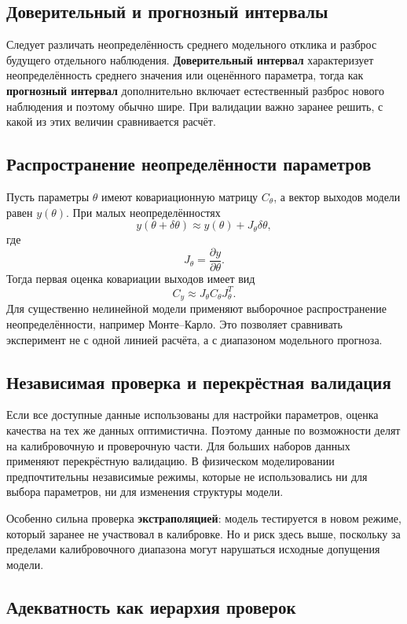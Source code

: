 \subsection{Доверительный и прогнозный интервалы}

Следует различать неопределённость среднего модельного отклика и разброс будущего
отдельного наблюдения. \textbf{Доверительный интервал} характеризует
неопределённость среднего значения или оценённого параметра, тогда как
\textbf{прогнозный интервал} дополнительно включает естественный разброс нового
наблюдения и поэтому обычно шире. При валидации важно заранее решить, с какой из
этих величин сравнивается расчёт.

\subsection{Распространение неопределённости параметров}

Пусть параметры $\theta$ имеют ковариационную матрицу $C_\theta$, а вектор
выходов модели равен $y(\theta)$. При малых неопределённостях
\[
    y(\theta+\delta\theta)
    \approx y(\theta)+J_\theta\delta\theta,
\]
где
\[
    J_\theta=\frac{\partial y}{\partial\theta}.
\]
Тогда первая оценка ковариации выходов имеет вид
\[
    \boxed{C_y\approx J_\theta C_\theta J_\theta^T.}
\]
Для существенно нелинейной модели применяют выборочное распространение
неопределённости, например Монте--Карло. Это позволяет сравнивать эксперимент не
с одной линией расчёта, а с диапазоном модельного прогноза.

\subsection{Независимая проверка и перекрёстная валидация}

Если все доступные данные использованы для настройки параметров, оценка качества
на тех же данных оптимистична. Поэтому данные по возможности делят на
калибровочную и проверочную части. Для больших наборов данных применяют
перекрёстную валидацию. В физическом моделировании предпочтительны независимые
режимы, которые не использовались ни для выбора параметров, ни для изменения
структуры модели.

Особенно сильна проверка \textbf{экстраполяцией}: модель тестируется в новом
режиме, который заранее не участвовал в калибровке. Но и риск здесь выше,
поскольку за пределами калибровочного диапазона могут нарушаться исходные
допущения модели.

\subsection{Адекватность как иерархия проверок}

